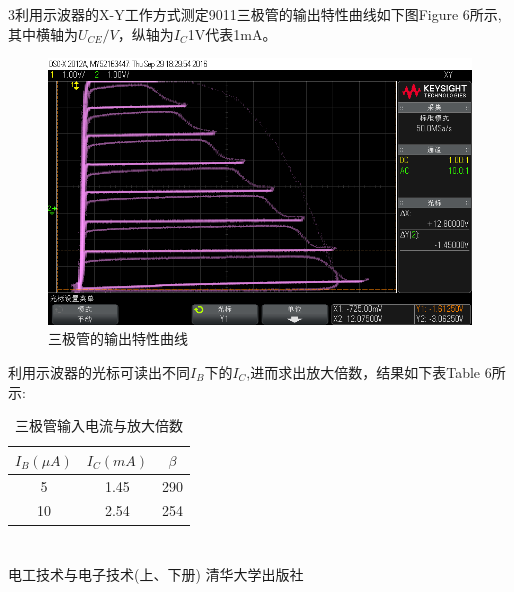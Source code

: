 ﻿\documentclass[10.5pt]{ctexart}
\begin{document}
3利用示波器的X-Y工作方式测定9011三极管的输出特性曲线如下图Figure 6所示,
其中横轴为$U_{CE}/V$，纵轴为$I_C$1V代表1mA。
\newpage
\begin{figure}[!ht]
\centering
\caption{三极管的输出特性曲线}
\includegraphics[width=350pt]{image/outputOfTransistor.png}
\end{figure}
利用示波器的光标可读出不同$I_B$下的$I_C$,进而求出放大倍数，结果如下表Table 6所示:
\begin{table}[!ht]
\centering
\caption{三极管输入电流与放大倍数}
\begin{tabular}{ccc}
\hline
$I_B(\mu A)$ & $I_C(mA)$ & $\beta$ \\
\hline
 5 & 1.45 &  290  \\
 10 & 2.54 &  254  \\
\hline
\end{tabular}
\end{table}


\section{\textbf{}}
\begin{thebibliography}{}
电工技术与电子技术(上、下册) \quad 清华大学出版社
\end{thebibliography}
\end{document}

